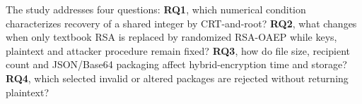 The study addresses four questions: \textbf{RQ1}, which numerical condition characterizes recovery of a shared integer by CRT-and-root? \textbf{RQ2}, what changes when only textbook RSA is replaced by randomized RSA-OAEP while keys, plaintext and attacker procedure remain fixed? \textbf{RQ3}, how do file size, recipient count and JSON/Base64 packaging affect hybrid-encryption time and storage? \textbf{RQ4}, which selected invalid or altered packages are rejected without returning plaintext?
